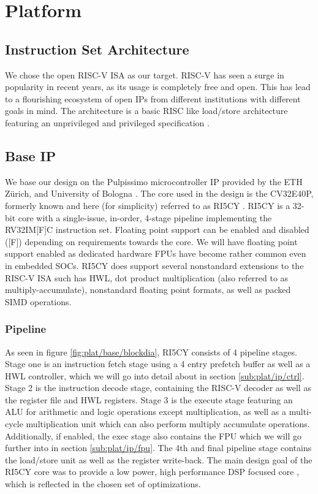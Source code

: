 \documentclass[../bachelor_paper.tex]{subfiles}
\begin{document}
\chapter{Platform}
    \label{ch:plat}

\section{Instruction Set Architecture}
We chose the open RISC-V \ac{ISA} as our target. RISC-V has seen a surge in popularity in recent years, as its usage is completely free and open. This has lead to a flourishing ecosystem of open IPs from different institutions with different goals in mind. The architecture is a basic RISC like load/store architecture featuring an unprivileged and privileged specification \cite{RISCVInstructionSet2022}.

\section{Base IP}
We base our design on the Pulpissimo microcontroller IP provided by the ETH Z\"urich, and University of Bologna \cite{schiavoneQuentinUltraLowPowerPULPissimo2018}. The core used in the design is the CV32E40P, formerly known and here (for simplicity) referred to as RI5CY \cite{gautschiNearThresholdRISCVCore2017}. RI5CY is a 32-bit core with a single-issue, in-order, 4-stage pipeline implementing the RV32IM[F]C instruction set. Floating point support can be enabled and disabled ([F]) depending on requirements towards the core. We will have floating point support enabled as dedicated hardware \acp{FPU} have become rather common even in embedded \acp{SOC}. RI5CY does support several nonstandard extensions to the RISC-V \ac{ISA} such has \acl{HWL}, dot product multiplication (also referred to as multiply-accumulate), nonstandard floating point formats, as well as packed SIMD operations.

\subsection{Pipeline}
As seen in figure \ref{fig:plat/base/blockdia}, RI5CY consists of 4 pipeline stages. Stage one is an instruction fetch stage using a 4 entry prefetch buffer as well as a \ac{HWL} controller, which we will go into detail about in section \ref{sub:plat/ip/ctrl}. Stage 2 is the instruction decode stage, containing the RISC-V decoder as well as the register file and \ac{HWL} registers. Stage 3 is the execute stage featuring an \ac{ALU} for arithmetic and logic operations except multiplication, as well as a multi-cycle multiplication unit which can also perform multiply accumulate operations. Additionally, if enabled, the exec stage also contains the \ac{FPU} which we will go further into in section \ref{sub:plat/ip/fpu}. The 4th and final pipeline stage contains the load/store unit as well as the register write-back. The main design goal of the RI5CY core was to provide a low power, high performance \ac{DSP} focused core \cite{gautschiNearThresholdRISCVCore2017}, which is reflected in the chosen set of optimizations.
\end{document}
